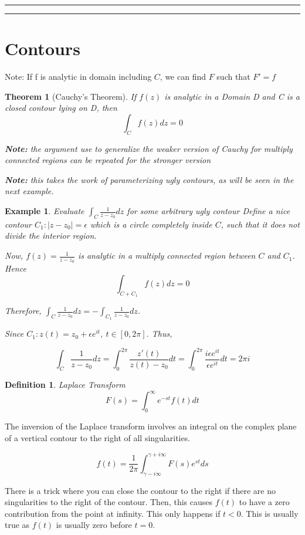 \documentclass{article}
\newtheorem{theorem}{Theorem}[section]
\newtheorem{ex}{Example}
\theoremstyle{definition}
\newtheorem{definition}{Definition}[section]
\newcommand{\Section}[1]{\hrule\hrule\section{#1}}
\newcommand{\Def}[2]{
\begin{shaded*}
\begin{definition}{\textit{#1}}\\#2\end{definition}
\end{shaded*}
}
\begin{document}
\Section{Contours}

Note: If f is analytic in domain including $C$, we can find $F$ such that $F'=f$

\begin{theorem}[Cauchy's Theorem]
If $f(z)$ is analytic in a Domain D and C is a closed contour lying on D, then $$\int_{C} f(z) dz = 0$$

\textbf{Note:} the argument use to generalize the weaker version of Cauchy for multiply connected regions can be repeated for the stronger version

\textbf{Note:} this takes the work of parameterizing ugly contours, as will be seen in the next example.
\end{theorem}

\begin{ex}
Evaluate $\int_C \frac{1}{z-z_0}dz$ for some arbitrary ugly contour
Define a nice contour $C_1 : |z-z_0| = \epsilon$ which is a circle completely inside $C$, such that it does not divide the interior region.

Now, $f(z) = \frac{1}{z-z_0}$ is analytic in a multiply connected region between $C$ and $C_1$. Hence
$$\int_{C+C_1}f(z)dz = 0$$

Therefore, $\int_C \frac{1}{z-z_0}dz = -\int_{C_1} \frac{1}{z-z_0}dz$. 

Since $C_1 : z(t) = z_0 + \epsilon e^{it},\ t \in [0, 2\pi]$. Thus, 

$$\int_C \frac{1}{z-z_0}dz = \int_{0}^{2\pi}\frac{z'(t)}{z(t)-z_0} dt = \int_{0}^{2\pi} \frac{i\epsilon e^{it}}{\epsilon e^{it}} dt = 2\pi i$$
\end{ex}

\Def{Laplace Transform}{$$F(s) = \int_{0}^{\infty} e^{-st} f(t) dt$$

The inversion of the Laplace transform involves an integral on the complex plane of a vertical contour to the right of all singularities. 

$$f(t) = \frac{1}{2\pi}\int_{\gamma - i \infty}^{\gamma + i \infty} F(s) e^{st}ds $$

There is a trick where you can close the contour to the right if there are no singularities to the right of the contour. Then, this causes $f(t)$ to have a zero contribution from the point at infinity. This only happens if $t<0$. This is usually true as $f(t)$ is usually zero before $t=0$.}
\end{document}

